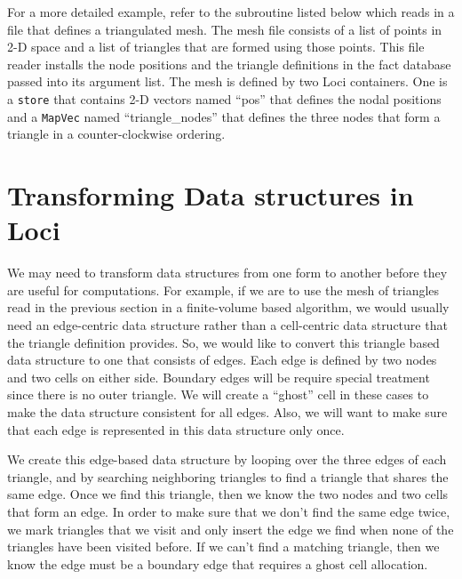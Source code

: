 \documentclass[10pt,epsf]{book}
\begin{document}
For a more detailed example, refer to the subroutine listed below
which reads in a file that defines a triangulated mesh.  The mesh file
consists of a list of points in 2-D space and a list of triangles that
are formed using those points.  This file reader installs the node
positions and the triangle definitions in the fact database passed
into its argument list.  The mesh is defined by two Loci containers.
One is a {\tt store} that contains 2-D vectors named ``pos'' that
defines the nodal positions and a {\tt MapVec} named
``triangle\_nodes'' that defines the three nodes that form a triangle
in a counter-clockwise ordering.



\section{Transforming Data structures in Loci}

We may need to transform data structures from one form to another
before they are useful for computations.  For example, if we are
to use the mesh of triangles read in the previous section in a
finite-volume based algorithm, we would usually need an edge-centric
data structure rather than a cell-centric data structure that the
triangle definition provides.  So, we would like to convert this
triangle based data structure to one that consists of edges.  Each
edge is defined by two nodes and two cells on either side.  Boundary
edges will be require special treatment since there is no outer
triangle.  We will create a ``ghost'' cell in these cases to make the
data structure consistent for all edges.  Also, we will want to make
sure that each edge is represented in this data structure only once.

We create this edge-based data structure by looping over the three
edges of each triangle, and by searching neighboring triangles to find a
triangle that shares the same edge.  Once we find this triangle, then
we know the two nodes and two cells that form an edge.  In order to
make sure that we don't find the same edge twice, we mark triangles
that we visit and only insert the edge we find when none of the
triangles have been visited before.  If we can't find a matching
triangle, then we know the edge must be a boundary edge that requires
a ghost cell allocation.
\end{document}
